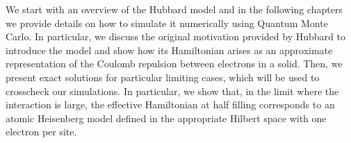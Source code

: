 
\label{cap:hubbard}

\slshape

We start with an overview of the Hubbard model and in the following chapters we provide details on how to simulate it numerically using Quantum Monte Carlo. In particular, we discuss the original motivation provided by Hubbard to introduce the model and show how its Hamiltonian arises as an approximate representation of the Coulomb repulsion between electrons in a solid. Then, we present exact solutions for particular limiting cases, which will be used to crosscheck our simulations. In particular, we show that, in the limit where the interaction is large, the effective Hamiltonian at half filling corresponds to an atomic Heisenberg model defined in the appropriate Hilbert space with one electron per site.

\normalfont








\cleardoublepage
